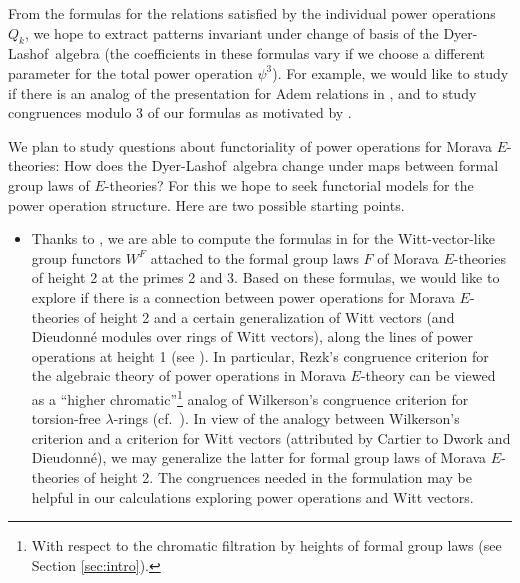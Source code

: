 \documentclass{rs}
\theoremstyle{definition}
\theoremstyle{remark}
\newcommand{\DL}{Dyer-Lashof~}
\newcommand{\p}{\psi^3}
\begin{document}
From the formulas for the relations satisfied by the individual power operations $Q_k$, 
we hope to extract patterns invariant under change of basis of the \DL algebra 
(the coefficients in these formulas vary if we choose a different parameter for the total power operation $\p$).  
For example, we would like to study if there is an analog of the presentation for Adem relations in \cite{bullettmacdonald}, 
and to study congruences modulo 3 of our formulas as motivated by \cite[Section 4.8]{mc1}.  

We plan to study questions about functoriality of power operations for Morava $E$-theories: 
How does the \DL algebra change under maps between formal group laws of $E$-theories?  
For this we hope to seek functorial models for the power operation structure.  
Here are two possible starting points.  
\begin{itemize}
 \item Thanks to \cite[Section 9.1]{pearson}, we are able to compute the formulas in \cite[25.1.2 and 25.1.11]{FG} 
 for the Witt-vector-like group functors $W^F$ \cite[Theorem 25.1.12 and Remark 25.1.14]{FG} 
 attached to the formal group laws $F$ of Morava $E$-theories of height 2 at the primes 2 and 3.  
 Based on these formulas, we would like to explore if there is a connection 
 between power operations for Morava $E$-theories of height 2 
 and a certain generalization of Witt vectors (and Dieudonn\'e modules over rings of Witt vectors), 
 along the lines of power operations at height 1 (see \cite[Section 4]{hopkins}).  
 In particular, Rezk's congruence criterion for the algebraic theory of power operations in Morava $E$-theory \cite[Theorem A]{cong} 
 can be viewed as a ``higher chromatic''\footnote{With respect to the chromatic filtration by heights of formal group laws (see Section \ref{sec:intro}).  } analog 
 of Wilkerson's congruence criterion for torsion-free $\lambda$-rings \cite[Proposition 1.2]{wilkerson} (cf.~\cite[Section 1]{cong}).  
 In view of the analogy between Wilkerson's criterion 
 and a criterion for Witt vectors \cite[VII.4.6]{lazard} (attributed by Cartier to Dwork and Dieudonn\'e), 
 we may generalize the latter for formal group laws of Morava $E$-theories of height 2.  
 The congruences needed in the formulation may be helpful in our calculations exploring power operations and Witt vectors.  


\end{itemize}
\end{document}
